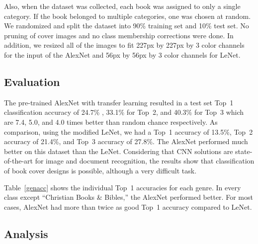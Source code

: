 \documentclass[conference]{IEEEtran}
\begin{document}
Also, when the dataset was collected, each book was assigned to only a single category. 
If the book belonged to multiple categories, one was chosen at random.
We randomized and split the dataset into 90\% training set and 10\% test set.
No pruning of cover images and no class membership corrections were done.
In addition, we resized all of the images to fit 227px by 227px by 3 color channels for the input of the AlexNet and 56px by 56px by 3 color channels for LeNet.

\subsection{Evaluation}




The pre-trained AlexNet with transfer learning resulted in a test set Top~1 classification accuracy of 24.7\% , 33.1\% for Top~2, and 40.3\% for Top~3 which are 7.4, 5.0, and 4.0 times better than random chance respectively.
As comparison, using the modified LeNet, we had a Top~1 accuracy of 13.5\%, Top~2 accuracy of 21.4\%, and Top~3 accuracy of 27.8\%.
The AlexNet performed much better on this dataset than the LeNet.
Considering that CNN solutions are state-of-the-art for image and document recognition, the results show that classification of book cover designs is possible, although a very difficult task.


Table~\ref{genacc} shows the individual Top~1 accuracies for each genre.
In every class except ``Christian Books \& Bibles,'' the AlexNet performed better.
For most cases, AlexNet had more than twice as good Top~1 accuracy compared to LeNet.

\subsection{Analysis}
\end{document}
